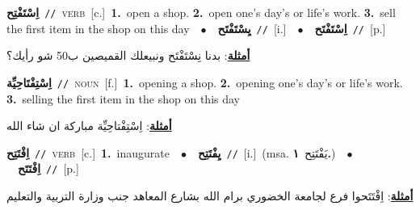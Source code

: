 \documentclass[10pt,a4paper,twoside]{article} %
\begin{document}
\begin{multicols}{2}
{{{\setlength\topsep{0pt}\textbf{\foreignlanguage{arabic}{اِسْتَفْتِح}}\ {\color{gray}\texttt{//}\color{black}}\ \textsc{verb}\ [c.]\ \textbf{1.}~open a shop.  \textbf{2.}~open one's day's or life's work.  \textbf{3.}~sell the first item in the shop on this day\ \ $\bullet$\ \ \setlength\topsep{0pt}\textbf{\foreignlanguage{arabic}{يِسْتَفْتَح}}\ {\color{gray}\texttt{//}\color{black}}\ [i.]\ \ $\bullet$\ \ \setlength\topsep{0pt}\textbf{\foreignlanguage{arabic}{اِسْتَفْتَح}}\ {\color{gray}\texttt{//}\color{black}}\ [p.]\  \begin{flushright}\color{gray}\foreignlanguage{arabic}{\textbf{\underline{\foreignlanguage{arabic}{أمثلة}}}: بدنا نِسْتَفْتَح ونبيعلك القميصين ب50 شو رأيك؟}\end{flushright}\color{black}} \vspace{2mm}

{\setlength\topsep{0pt}\textbf{\foreignlanguage{arabic}{اِسْتِفْتَاحِيِّة}}\ {\color{gray}\texttt{//}\color{black}}\ \textsc{noun}\ [f.]\ \textbf{1.}~opening a shop.  \textbf{2.}~opening one's day's or life's work.  \textbf{3.}~selling the first item in the shop on this day\  \begin{flushright}\color{gray}\foreignlanguage{arabic}{\textbf{\underline{\foreignlanguage{arabic}{أمثلة}}}: اِسْتِفْتاحِيِّة مباركة ان شاء الله}\end{flushright}\color{black}} \vspace{2mm}

{\setlength\topsep{0pt}\textbf{\foreignlanguage{arabic}{اِفْتَتِح}}\ {\color{gray}\texttt{//}\color{black}}\ \textsc{verb}\ [c.]\ \textbf{1.}~inaugurate\ \ $\bullet$\ \ \setlength\topsep{0pt}\textbf{\foreignlanguage{arabic}{يِفْتَتِح}}\ {\color{gray}\texttt{//}\color{black}}\ [i.]\ \color{gray}(msa. \foreignlanguage{arabic}{يَفْتَتِح}~\foreignlanguage{arabic}{\textbf{١.}})\color{black}\ \ $\bullet$\ \ \setlength\topsep{0pt}\textbf{\foreignlanguage{arabic}{اِفْتَتَح}}\ {\color{gray}\texttt{//}\color{black}}\ [p.]\  \begin{flushright}\color{gray}\foreignlanguage{arabic}{\textbf{\underline{\foreignlanguage{arabic}{أمثلة}}}: اِفْتَتَحوا فرع لجامعة الخضوري برام الله بشارع المعاهد جنب وزارة التربية والتعليم}\end{flushright}\color{black}} \vspace{2mm}

}}
\end{multicols}
\end{document}
